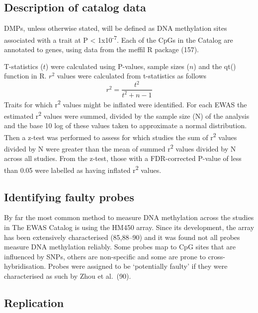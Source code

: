 \documentclass[11pt,oneside]{bristolthesis}
\begin{document}
\hypertarget{description-of-data}{%
\subsection*{Description of catalog data}\label{description-of-data}}

DMPs, unless otherwise stated, will be defined as DNA methylation sites associated with a trait at P \textless{} 1x10\textsuperscript{-7}. Each of the CpGs in the Catalog are annotated to genes, using data from the meffil R package (157).

T-statistics (\(t\)) were calculated using P-values, sample sizes (\(n\)) and the qt() function in R. \(r^2\) values were calculated from t-statistics as follows
\begin{equation}
    r^2 = \frac{t^2} {t^2 + n - 1}
    \label{eq:r-squared}
\end{equation}
Traits for which r\textsuperscript{2} values might be inflated were identified. For each EWAS the estimated r\textsuperscript{2} values were summed, divided by the sample size (N) of the analysis and the base 10 log of these values taken to approximate a normal distribution. Then a z-test was performed to assess for which studies the sum of r\textsuperscript{2} values divided by N were greater than the mean of summed r\textsuperscript{2} values divided by N across all studies. From the z-test, those with a FDR-corrected P-value of less than 0.05 were labelled as having inflated r\textsuperscript{2} values.

\hypertarget{identifying-faulty-probes}{%
\subsection{Identifying faulty probes}\label{identifying-faulty-probes}}

By far the most common method to measure DNA methylation across the studies in The EWAS Catalog is using the HM450 array. Since its development, the array has been extensively characterised (85,88--90) and it was found not all probes measure DNA methylation reliably. Some probes map to CpG sites that are influenced by SNPs, others are non-specific and some are prone to cross-hybridisation. Probes were assigned to be `potentially faulty' if they were characterised as such by Zhou et al.~(90).

\hypertarget{replication-methods-04}{%
\subsection{Replication}\label{replication-methods-04}}
\end{document}
